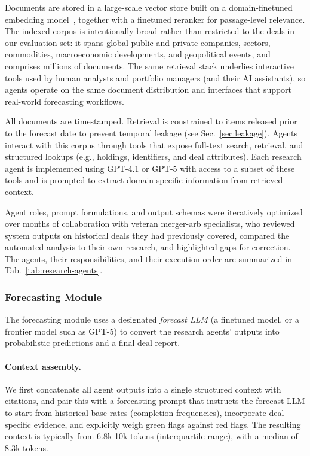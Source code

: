 \documentclass{article}
\theoremstyle{plain}
\theoremstyle{definition}
\theoremstyle{remark}
\begin{document}
Documents are stored in a large-scale vector store built on a domain-finetuned embedding model~\cite{finance_embeds}, together with a finetuned reranker for passage-level relevance. The indexed corpus is intentionally broad rather than restricted to the deals in our evaluation set: it spans global public and private companies, sectors, commodities, macroeconomic developments, and geopolitical events, and comprises millions of documents. The same retrieval stack underlies interactive tools used by human analysts and portfolio managers (and their AI assistants), so agents operate on the same document distribution and interfaces that support real-world forecasting workflows. 

All documents are timestamped. Retrieval is constrained to items released prior to the forecast date to prevent temporal leakage (see Sec.~\ref{sec:leakage}). Agents interact with this corpus through tools that expose full-text search, retrieval, and structured lookups (e.g., holdings, identifiers, and deal attributes). Each research agent is implemented using GPT-4.1 or GPT-5 with access to a subset of these tools and is prompted to extract domain-specific information from retrieved context. 

Agent roles, prompt formulations, and output schemas were iteratively optimized over months of collaboration with veteran merger-arb specialists, who reviewed system outputs on historical deals they had previously covered, compared the automated analysis to their own research, and highlighted gaps for correction. The agents, their responsibilities, and their execution order are summarized in Tab.~\ref{tab:research-agents}.

\subsubsection{Forecasting Module}

The forecasting module uses a designated \emph{forecast LLM} (a finetuned model, or a frontier model such as GPT-5) to convert the research agents' outputs into probabilistic predictions and a final deal report.

\paragraph{Context assembly.}
We first concatenate all agent outputs into a single structured context with citations, and pair this with a forecasting prompt that instructs the forecast LLM to start from historical base rates (completion frequencies), incorporate deal-specific evidence, and explicitly weigh green flags against red flags.
The resulting context is typically from 6.8k-10k tokens (interquartile range), with a median of 8.3k tokens.
\end{document}
